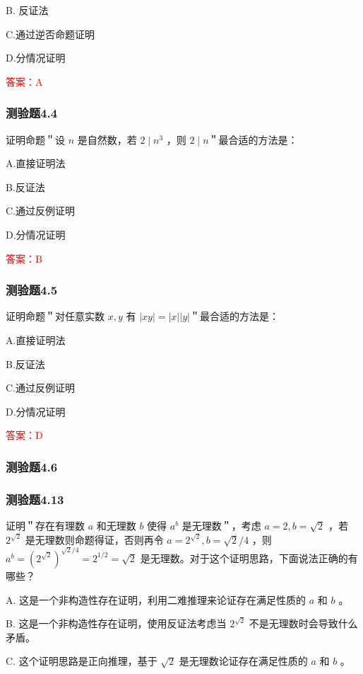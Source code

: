 \documentclass[UTF8, heading=true]{ctexart}
\begin{document}
B. 反证法

C.通过逆否命题证明

D.分情况证明

\textcolor{red}{答案：A}


\subsubsection{测验题4.4}

证明命题＂设 $n$ 是自然数，若 $2 \mid n^3$ ，则 $2 \mid n$＂最合适的方法是：

A.直接证明法

B.反证法

C.通过反例证明

D.分情况证明

\textcolor{red}{答案：B}

\subsubsection{测验题4.5}

证明命题＂对任意实数 $x, y$ 有 $|x y|=|x||y|$＂最合适的方法是：

A.直接证明法

B.反证法

C.通过反例证明

D.分情况证明

\textcolor{red}{答案：D}

\subsubsection{测验题4.6}

\subsubsection{测验题4.13}

证明＂存在有理数 $a$ 和无理数 $b$ 使得 $a^b$ 是无理数＂，考虑 $a=2, b=\sqrt{2}$ ，若 $2^{\sqrt{2}}$ 是无理数则命题得证，否则再令 $a=2^{\sqrt{2}}, b=\sqrt{2} / 4$ ，则 $a^b=\left(2^{\sqrt{2}}\right)^{\sqrt{2} / 4}=2^{1 / 2}=\sqrt{2}$ 是无理数。对于这个证明思路，下面说法正确的有哪些？

A. 这是一个非构造性存在证明，利用二难推理来论证存在满足性质的 $a$ 和 $b$ 。

B. 这是一个非构造性存在证明，使用反证法考虑当 $2^{\sqrt{2}}$ 不是无理数时会导致什么矛盾。

C. 这个证明思路是正向推理，基于 $\sqrt{2}$ 是无理数论证存在满足性质的 $a$ 和 $b$ 。
\end{document}
